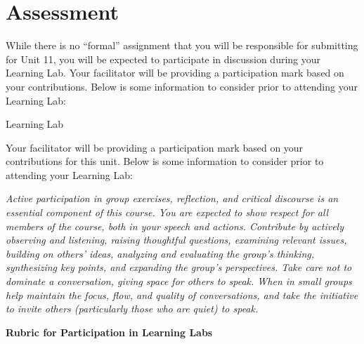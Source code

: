 \documentclass[
]{book}
\begin{document}
\hypertarget{assessment-10}{%
\section*{Assessment}\label{assessment-10}}

\begin{assessment}
While there is no ``formal'' assignment that you will be responsible for submitting for Unit 11, you will be expected to participate in discussion during your Learning Lab. Your facilitator will be providing a participation mark based on your contributions. Below is some information to consider prior to attending your Learning Lab:

{Learning Lab}

Your facilitator will be providing a participation mark based on your contributions for this unit. Below is some information to consider prior to attending your Learning Lab:

\emph{Active participation in group exercises, reflection, and critical discourse is an essential component of this course. You are expected to show respect for all members of the course, both in your speech and actions. Contribute by actively observing and listening, raising thoughtful questions, examining relevant issues, building on others' ideas, analyzing and evaluating the group's thinking, synthesizing key points, and expanding the group's perspectives. Take care not to dominate a conversation, giving space for others to speak. When in small groups help maintain the focus, flow, and quality of conversations, and take the initiative to invite others (particularly those who are quiet) to speak.}

\textbf{Rubric for Participation in Learning Labs}


\end{assessment}
\end{document}
